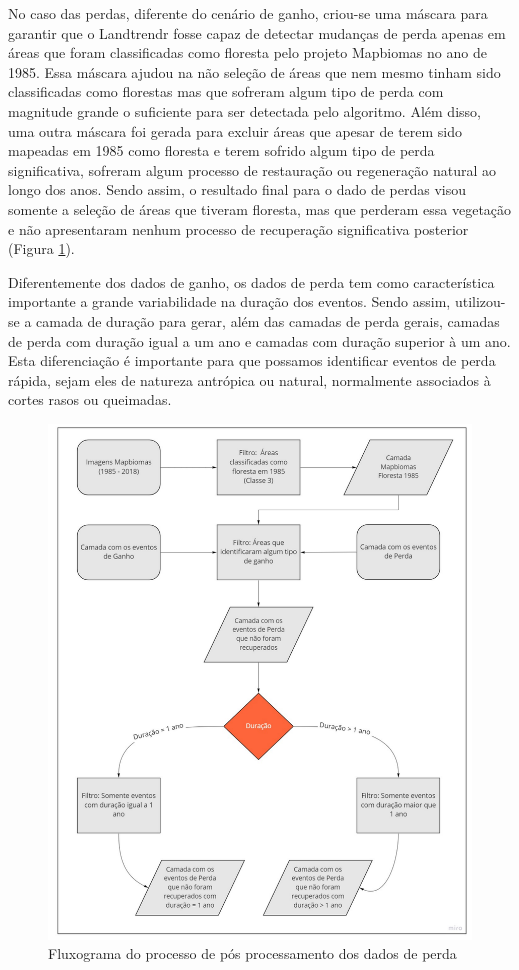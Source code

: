 No caso das perdas, diferente do cenário de ganho, criou-se uma máscara para garantir que o Landtrendr fosse capaz de detectar mudanças de perda apenas em áreas que foram classificadas como floresta pelo projeto Mapbiomas no ano de 1985. Essa máscara ajudou na não seleção de áreas que nem mesmo tinham sido classificadas como florestas mas que sofreram algum tipo de perda com magnitude grande o suficiente para ser detectada pelo algoritmo. Além disso, uma outra máscara foi gerada para excluir áreas que apesar de terem sido mapeadas em 1985 como floresta e terem sofrido algum tipo de perda significativa, sofreram algum processo de restauração ou regeneração natural ao longo dos anos. Sendo assim, o resultado final para o dado de perdas visou somente a seleção de áreas que tiveram floresta, mas que perderam essa vegetação e não apresentaram nenhum processo de recuperação significativa posterior (Figura \ref{fig:flowchart_perda}).

Diferentemente dos dados de ganho, os dados de perda tem como característica importante a grande variabilidade na duração dos eventos. Sendo assim, utilizou-se a camada de duração para gerar, além das camadas de perda gerais, camadas de perda com duração igual a um ano e camadas com duração superior à um ano. Esta diferenciação é importante para que possamos identificar eventos de perda rápida, sejam eles de natureza antrópica ou natural, normalmente associados à cortes rasos ou queimadas.

\begin{figure}[H]
    \centering
    \includegraphics[scale=.4]{images/flow_perda.pdf}
    \caption{Fluxograma do processo de pós processamento dos dados de perda}
    \label{fig:flowchart_perda}
\end{figure}

